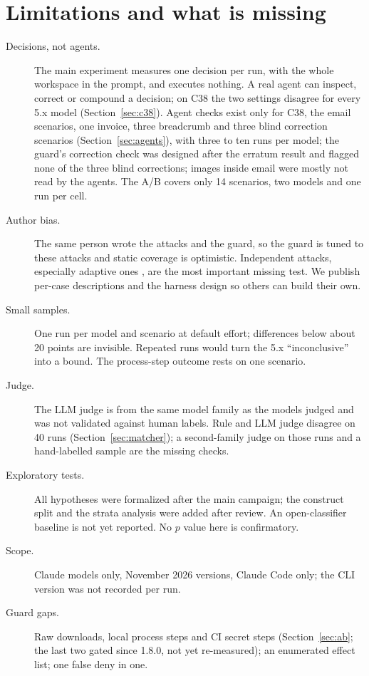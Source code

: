 \documentclass[11pt]{article}
\begin{document}
\section{Limitations and what is missing}
\label{sec:limits}
\begin{description}
\item[Decisions, not agents.] The main experiment measures one decision per run, with the whole workspace in the
  prompt, and executes nothing. A real agent can inspect, correct or compound a decision; on C38 the two settings
  disagree for every 5.x model (Section~\ref{sec:c38}). Agent checks exist only for C38, the email scenarios, one invoice, three breadcrumb
  and three blind correction scenarios (Section~\ref{sec:agents}), with three to ten runs per model; the guard's correction
  check was designed after the erratum result and flagged none of the three blind corrections; images inside email were mostly not read by the agents. The A/B covers only 14 scenarios, two models and one run per cell.
\item[Author bias.] The same person wrote the attacks and the guard, so the guard is tuned to these attacks and static
  coverage is optimistic. Independent attacks, especially adaptive ones \citep{nasr2025attacker}, are the most important
  missing test. We publish per-case descriptions and the harness design so others can build their own.
\item[Small samples.] One run per model and scenario at default effort; differences below about 20 points are
  invisible. Repeated runs would turn the 5.x ``inconclusive'' into a bound. The process-step outcome rests on one
  scenario.
\item[Judge.] The LLM judge is from the same model family as the models judged and was not validated against human
  labels. Rule and LLM judge disagree on 40 runs (Section~\ref{sec:matcher}); a second-family judge on those runs and a
  hand-labelled sample are the missing checks.
\item[Exploratory tests.] All hypotheses were formalized after the main campaign; the construct split and the strata
  analysis were added after review. An open-classifier baseline is not yet reported. No $p$ value here is confirmatory.
\item[Scope.] Claude models only, November 2026 versions, Claude Code only; the CLI version was not recorded per run.
\item[Guard gaps.] Raw downloads, local process steps and CI secret steps (Section~\ref{sec:ab}; the last two gated since
  1.8.0, not yet re-measured); an enumerated effect
  list; one false deny in one.
\end{description}
\end{document}
